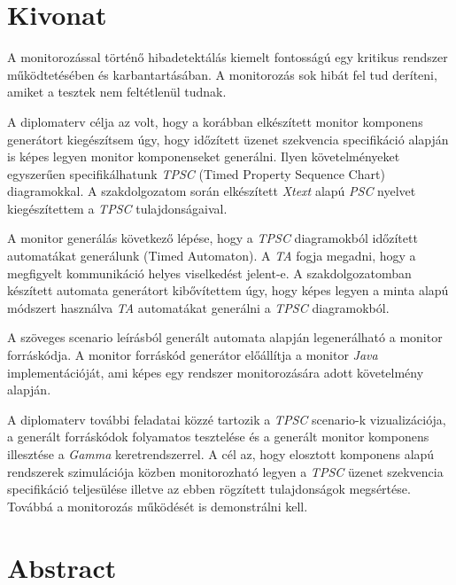\setcounter{page}{1}

\selecthungarian

\chapter*{Kivonat}

A monitorozással történő hibadetektálás kiemelt fontosságú egy kritikus rendszer működtetésében és karbantartásában.
A monitorozás sok hibát fel tud deríteni, amiket a tesztek nem feltétlenül tudnak.

A diplomaterv célja az volt, hogy a korábban elkészített monitor komponens generátort kiegészítsem úgy, hogy időzített üzenet szekvencia specifikáció alapján is képes legyen monitor komponenseket generálni.
Ilyen követelményeket egyszerűen specifikálhatunk \textit{TPSC} (Timed Property Sequence Chart) diagramokkal.
A szakdolgozatom során elkészített \textit{Xtext} alapú \textit{PSC} nyelvet kiegészítettem a \textit{TPSC} tulajdonságaival.

A monitor generálás következő lépése, hogy a \textit{TPSC} diagramokból időzített automatákat generálunk (Timed Automaton).
A \textit{TA} fogja megadni, hogy a megfigyelt kommunikáció helyes viselkedést jelent-e.
A szakdolgozatomban készített automata generátort kibővítettem úgy, hogy képes legyen a minta alapú módszert használva \textit{TA} automatákat generálni a \textit{TPSC} diagramokból.

A szöveges scenario leírásból generált automata alapján legenerálható a monitor forráskódja.
A monitor forráskód generátor előállítja a monitor \textit{Java} implementációját, ami képes egy rendszer monitorozására adott követelmény alapján.

A diplomaterv további feladatai közzé tartozik a \textit{TPSC} scenario-k vizualizációja, a generált forráskódok folyamatos tesztelése és a generált monitor komponens illesztése a \textit{Gamma} keretrendszerrel.
A cél az, hogy elosztott komponens alapú rendszerek szimulációja közben monitorozható legyen a \textit{TPSC} üzenet szekvencia specifikáció teljesülése illetve az ebben rögzített tulajdonságok megsértése.
Továbbá a monitorozás működését is demonstrálni kell.

\vfill
\selectenglish


\chapter*{Abstract}



\vfill
\selectthesislanguage

\setcounter{romanPage}{\value{page}}
